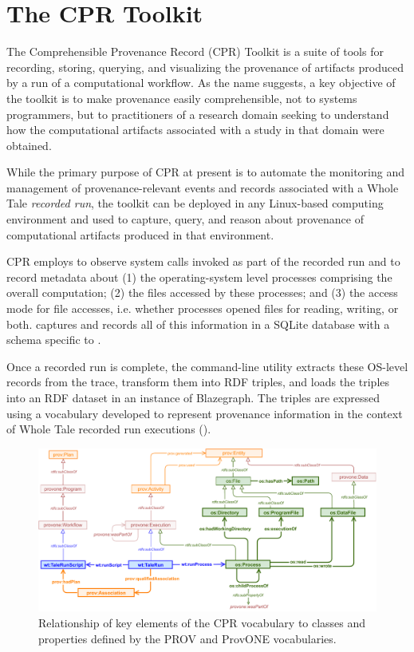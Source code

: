 \section{The CPR Toolkit}

The Comprehensible Provenance Record (CPR) Toolkit is a suite of tools for recording, storing, querying, and visualizing the provenance of artifacts produced by a run of a computational workflow. As the name suggests, a key objective of the toolkit is to make provenance easily comprehensible, not to systems programmers, but to practitioners of a research domain seeking to understand how the computational artifacts associated with a study in that domain were obtained.

While the primary purpose of CPR at present is to automate the monitoring and management of provenance-relevant events and records associated with a Whole Tale \emph{recorded run}, the toolkit can be deployed in any Linux-based computing environment and used to capture, query, and reason about provenance of computational artifacts produced in that environment.

CPR employs  \cite{rampin_reprozip_2016} to observe system calls invoked as part of the recorded run and to record metadata about (1) the operating-system level processes comprising the overall computation; (2) the files accessed by these processes; and (3) the access mode for file accesses, i.e. whether processes opened files for reading, writing, or both.  captures and records all of this information in a SQLite database with a schema specific to .

Once a recorded run is complete, the  command-line utility extracts these OS-level records from the  trace, transform them into RDF triples, and loads the triples into an RDF dataset in an instance of Blazegraph. The triples are expressed using a vocabulary developed to represent provenance information in the context of Whole Tale recorded run executions (). 

\begin{figure}[h]
    \includegraphics[width=\linewidth]{figures/cpr-vocab.pdf}
    \caption{Relationship of key elements of the CPR vocabulary to classes and properties defined by the PROV and ProvONE vocabularies.}
    \label{fig:cpr-vocab}
\end{figure}

